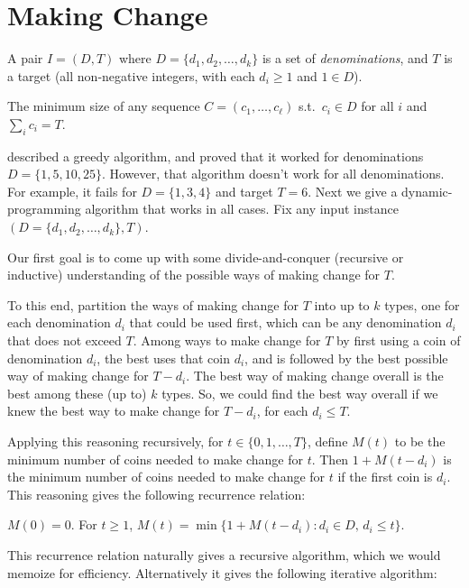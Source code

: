 \section{Making Change}\label{dp: sec: making change}

\begin{mylist}
\item[\bf input:]
  A pair $I=(D, T)$ where
  $D=\{d_1, d_2, \ldots, d_k\}$
  is a set of \emph{denominations},
  and $T$ is a target
  (all non-negative integers, with each $d_i\ge 1$ and $1\in D$).

\item[\bf output:]
  The minimum size of any sequence $C=(c_1, \ldots, c_\ell)$
  s.t.~$c_i\in D$ for all $i$
  and $\sum_i c_i = T$.
\end{mylist}

 described a greedy algorithm,
and proved that it worked for denominations $D=\{1,5,10,25\}$.
However, that algorithm doesn't work for all denominations.
For example, it fails for $D=\{1, 3, 4\}$ and target $T=6$.
Next we give a dynamic-programming algorithm that works in all cases.
Fix any input instance $(D=\{d_1, d_2, \ldots, d_k\}, T)$.

Our first goal is to come up with some divide-and-conquer
(recursive or inductive) understanding of the possible ways of making change for $T$.

To this end, partition the ways of making change for $T$ into up to $k$ types,
one for each denomination $d_i$ that could be used first,
which can be any denomination  $d_i$ that does not exceed $T$.
Among ways to make change for $T$ by first using a coin of denomination $d_i$,
the best uses that coin $d_i$, and is followed by the best possible
way of making change for $T-d_i$.
The best way of making change overall is the best among these (up to) $k$ types.
So, we could find the best way overall if we knew the best
way to make change for $T-d_i$, for each $d_i\le T$.

Applying this reasoning recursively,
for $t\in\{0,1,\ldots, T\}$, define $M(t)$ to be the minimum number of coins
needed to make change for $t$.
Then $1+M(t-d_i)$ is the minimum number of coins
needed to make change for $t$ if the first coin is $d_i$.
This reasoning gives the following recurrence relation:

\begin{lemma}\label{dp: lemma: change} $M(0) = 0$.  For $t\ge 1$,
  \(
    M(t) = \min\{ 1 + M(t-d_i) : d_i \in D,\, d_i \le t\}.
  \)
\end{lemma}
This recurrence relation naturally gives a recursive algorithm,
which we would memoize for efficiency.
Alternatively it gives the following iterative algorithm:

